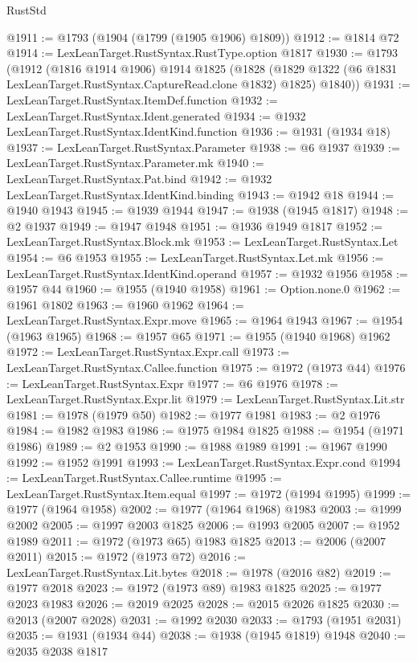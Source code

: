 \begin{lexlean}{RustStd}
\begin{coremodule}
@1911 := @1793 (@1904 (@1799 (@1905 @1906) @1809))
@1912 := @1814 @72
@1914 := LexLeanTarget.RustSyntax.RustType.option @1817
@1930 := @1793
    (@1912
      (@1816 @1914 @1906)
      @1914
      @1825
      (@1828 (@1829 @1322 (@6 @1831 LexLeanTarget.RustSyntax.CaptureRead.clone @1832) @1825) @1840))
@1931 := LexLeanTarget.RustSyntax.ItemDef.function
@1932 := LexLeanTarget.RustSyntax.Ident.generated
@1934 := @1932 LexLeanTarget.RustSyntax.IdentKind.function
@1936 := @1931 (@1934 @18)
@1937 := LexLeanTarget.RustSyntax.Parameter
@1938 := @6 @1937
@1939 := LexLeanTarget.RustSyntax.Parameter.mk
@1940 := LexLeanTarget.RustSyntax.Pat.bind
@1942 := @1932 LexLeanTarget.RustSyntax.IdentKind.binding
@1943 := @1942 @18
@1944 := @1940 @1943
@1945 := @1939 @1944
@1947 := @1938 (@1945 @1817)
@1948 := @2 @1937
@1949 := @1947 @1948
@1951 := @1936 @1949 @1817
@1952 := LexLeanTarget.RustSyntax.Block.mk
@1953 := LexLeanTarget.RustSyntax.Let
@1954 := @6 @1953
@1955 := LexLeanTarget.RustSyntax.Let.mk
@1956 := LexLeanTarget.RustSyntax.IdentKind.operand
@1957 := @1932 @1956
@1958 := @1957 @44
@1960 := @1955 (@1940 @1958)
@1961 := Option.none.{0}
@1962 := @1961 @1802
@1963 := @1960 @1962
@1964 := LexLeanTarget.RustSyntax.Expr.move
@1965 := @1964 @1943
@1967 := @1954 (@1963 @1965)
@1968 := @1957 @65
@1971 := @1955 (@1940 @1968) @1962
@1972 := LexLeanTarget.RustSyntax.Expr.call
@1973 := LexLeanTarget.RustSyntax.Callee.function
@1975 := @1972 (@1973 @44)
@1976 := LexLeanTarget.RustSyntax.Expr
@1977 := @6 @1976
@1978 := LexLeanTarget.RustSyntax.Expr.lit
@1979 := LexLeanTarget.RustSyntax.Lit.str
@1981 := @1978 (@1979 @50)
@1982 := @1977 @1981
@1983 := @2 @1976
@1984 := @1982 @1983
@1986 := @1975 @1984 @1825
@1988 := @1954 (@1971 @1986)
@1989 := @2 @1953
@1990 := @1988 @1989
@1991 := @1967 @1990
@1992 := @1952 @1991
@1993 := LexLeanTarget.RustSyntax.Expr.cond
@1994 := LexLeanTarget.RustSyntax.Callee.runtime
@1995 := LexLeanTarget.RustSyntax.Item.equal
@1997 := @1972 (@1994 @1995)
@1999 := @1977 (@1964 @1958)
@2002 := @1977 (@1964 @1968) @1983
@2003 := @1999 @2002
@2005 := @1997 @2003 @1825
@2006 := @1993 @2005
@2007 := @1952 @1989
@2011 := @1972 (@1973 @65) @1983 @1825
@2013 := @2006 (@2007 @2011)
@2015 := @1972 (@1973 @72)
@2016 := LexLeanTarget.RustSyntax.Lit.bytes
@2018 := @1978 (@2016 @82)
@2019 := @1977 @2018
@2023 := @1972 (@1973 @89) @1983 @1825
@2025 := @1977 @2023 @1983
@2026 := @2019 @2025
@2028 := @2015 @2026 @1825
@2030 := @2013 (@2007 @2028)
@2031 := @1992 @2030
@2033 := @1793 (@1951 @2031)
@2035 := @1931 (@1934 @44)
@2038 := @1938 (@1945 @1819) @1948
@2040 := @2035 @2038 @1817

\end{coremodule}
\end{lexlean}
